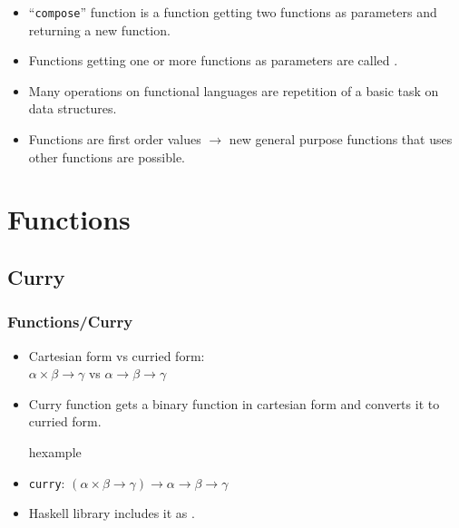 \begin{frame}
\begin{itemize}[<+->]
 \item ``\texttt{compose}'' function is a function getting two functions as
 parameters and returning a new function.
 \item Functions getting one or more functions as parameters are called
 .
 \item Many operations on functional languages are repetition of a basic
 task on data structures.
 \item Functions are first order values $\rightarrow$ new general purpose 
 functions that uses other functions are possible.
\end{itemize}
\end{frame}

\section{Functions}
\subsection{Curry}
\begin{frame}
\frametitle{Functions/Curry}
\begin{itemize}
\item Cartesian form vs curried form:\\
	$\alpha \times \beta \rightarrow \gamma$ vs 
	$\alpha \rightarrow \beta \rightarrow \gamma$
\item Curry function gets a binary function in cartesian form and converts it to curried form.
\begin{beamercolorbox}{hexample}
\codecurryH
\end{beamercolorbox}
 \item \texttt{curry}:
	$(\alpha \times \beta \rightarrow \gamma) \rightarrow
	\alpha \rightarrow \beta \rightarrow \gamma$
 \item Haskell library includes it as .
\end{itemize}
\end{frame}



